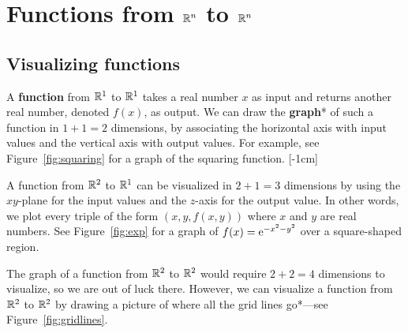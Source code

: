 \documentclass{watsonbook}
\begin{document}
\section{Functions from $\mathbb{R}^n$ to $\mathbb{R}^n$} \label{sec:RntoRn}

\subsection{Visualizing functions}

A \textbf{function} from $\mathbb{R}^1$ to $\mathbb{R}^1$ takes a real number $x$ as
input and returns another real number, denoted $f(x)$, as output. We
can draw the \textbf{graph}* of such a function in $1 + 1 = 2$
dimensions, by associating the horizontal axis with input values and
the vertical axis with output values. For example, see
Figure~\ref{fig:squaring} for a graph of the squaring
function. [-1cm]

A function from $\mathbb{R}^2$ to $\mathbb{R}^1$ can be visualized in $2 + 1 = 3$
dimensions by using the $xy$-plane for the input values and the
$z$-axis for the output value. In other words, we plot every triple of
the form $(x,y,f(x,y))$ where $x$ and $y$ are real numbers. See
Figure~\ref{fig:exp} for a graph of $f(x) = \mathrm{e}^{-x^2 - y^2}$ over a
square-shaped region.

The graph of a function from $\mathbb{R}^2$ to $\mathbb{R}^2$ would require
$2 + 2 = 4$ dimensions to visualize, so we are out of luck
there. However, we can visualize a function from $\mathbb{R}^2$ to $\mathbb{R}^2$ by
drawing a picture of where all the grid lines go*---see
Figure~\ref{fig:gridlines}.
\end{document}
